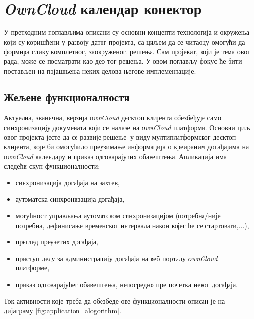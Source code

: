 \chapter{\textit{OwnCloud} календар конектор}
\label{chap:ownCloudCalendarSynchronization}

У претходним поглављима описани су основни концепти технологија и окружења који су коришћени у развоју датог пројекта, са циљем да се читаоцу омогући да формира слику комплетног, заокруженог, решења. Сам пројекат, који је тема овог рада, може се посматрати као део тог решења. У овом поглављу фокус ће бити постављен на појашњења неких делова његове имплементације.

\section{Жељене функционалности}

Актуелна, званична, верзија \textit{оwnCloud} десктоп клијента обезбеђује само синхронизацију докумената који се налазе на \textit{оwnCloud} платформи. Основни циљ овог пројекта јесте да се развије решење, у виду мултиплатформског десктоп клијента, које би омогућило преузимање информација о креираним догађајима на \textit{оwnCloud} календару и приказ одговарајућих обавештења. Апликација има следећи скуп функционалности:
\begin{itemize}
	\item{синхронизација догађаја на захтев},
	\item{аутоматска синхронизација догађаја},
	\item{могућност управљања аутоматском синхронизацијом (потребна/није потребна, дефинисање временског интервала након којег ће се стартовати,...)},
	\item{преглед преузетих догађаја},
	\item{приступ делу за администрацију догађаја на веб порталу \textit{оwnCloud} платформе},
	\item{приказ одговарајућег обавештења, непосредно пре почетка неког догађаја}.	
\end{itemize}

Ток активности које треба да обезбеде ове функционалности описан је на дијаграму \ref{fig:application_alogorithm}.

